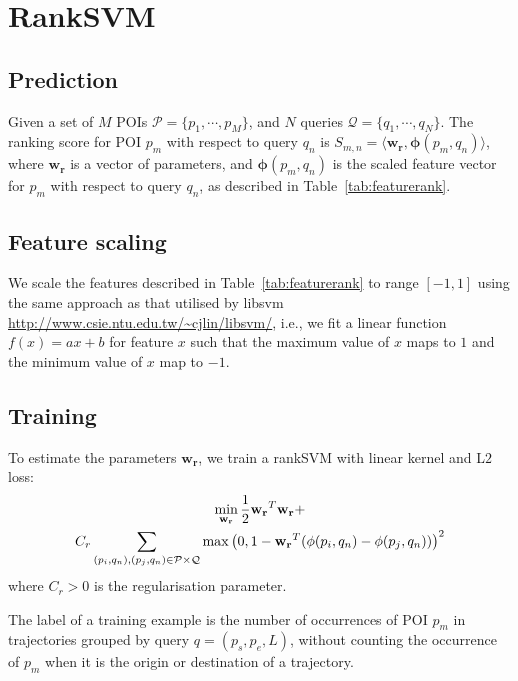 \section{RankSVM}
\label{appendix:ranksvm}

\subsection{Prediction}
Given a set of $M$ POIs $\mathcal{P} = \{p_1, \cdots, p_M\}$, 
and $N$ queries $\mathcal{Q} = \{q_1, \cdots, q_N\}$.
The ranking score for POI $p_m$ with respect to query $q_n$ is 
$S_{m,n} = \langle \mathbf{w_r}, \mathbf{\phi}(p_m, q_n) \rangle$,
where $\mathbf{w_r}$ is a vector of parameters,
and $\mathbf{\phi}(p_m, q_n)$ is the scaled feature vector for $p_m$ with respect to query $q_n$,
as described in Table~\ref{tab:featurerank}.

\subsection{Feature scaling}
We scale the features described in Table~\ref{tab:featurerank} to range $[-1, 1]$ using the same approach as that 
utilised by libsvm \url{http://www.csie.ntu.edu.tw/~cjlin/libsvm/},
i.e., we fit a linear function $f(x) = a x + b$ for feature $x$ such that the maximum value of $x$ maps to $1$ 
and the minimum value of $x$ map to $-1$.

\subsection{Training}
To estimate the parameters $\mathbf{w_r}$, we train a rankSVM with linear kernel and L$2$ loss:
\begin{multline}
\min_{\mathbf{w_r}} \frac{1}{2} \mathbf{w_r}^T \mathbf{w_r} + \\ \hfill
                    C_r \sum_{(p_i, q_n), (p_j, q_n) \in \mathcal{P} \times \mathcal{Q}}
                    \max \left( 0, 1 - \mathbf{w_r}^T (\mathbf{\phi}(p_i, q_n) - \mathbf{\phi}(p_j, q_n)) \right)^2
\end{multline}
where $C_r > 0$ is the regularisation parameter.

The label of a training example is the number of occurrences of POI $p_m$ in trajectories grouped by query $q = (p_s, p_e, L)$,
without counting the occurrence of $p_m$ when it is the origin or destination of a trajectory.


